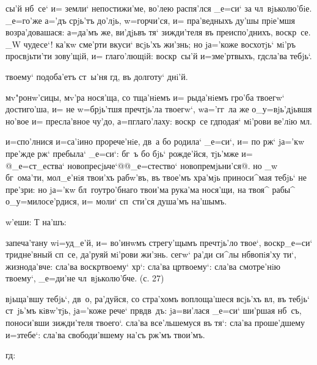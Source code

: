  сы'й нб~се` и= земли` непостижи'ме, во'лею 
распя'лся _е=си` за чл~вjьколю'бiе. _е=го'же а='дъ 
срjь'тъ до'лjь, w=горчи'ся, и= пра'ведныхъ ду'шы прiе'мшя 
возра'довашася: а=да'мъ же, ви'дjьвъ тя` зижди'теля въ 
преиспо'днихъ, воскр~се. _W чудесе`! ка'кw сме'рти вкуси` 
всjь'хъ жи'знь; но jа='коже восхотjь` мi'ръ просвjьти'ти 
зову'щiй, и= глаго'лющiй: воскр~сы'й и=з\ъ ме'ртвыхъ, 
гд сла'ва тебjь`.

  твоему` подоба'етъ ст~ы'ня гд, въ 
долготу` днi'й.

 мv"ронw'сицы, мv'ра нося'ща, со тща'нiемъ и= 
рыда'нiемъ гро'ба твоегw` достиго'ша, и= не w=брjь'тшя 
преч тjь'ла твоегw`, w\т а='гг~ла же о_у=вjь'дjьвшя 
но'вое и= пресла'вное чу'до, а=п глаго'лаху: 
воскр~се гд подая` мi'рови ве'лiю мл.



 и=спо'лнися и=са'iино прорече'нiе, дв~а бо 
родила` _е=си`, и= по рж` jа='кw пре'жде рж` 
пребыла` _е=си`: бг~ъ бо бjь` рожде'йся, тjь'мже и= 
@_е=ст_ества` новопресjьче`@{@_е=стество` 
новопремjьни'ся@}. но _w бг~ома'ти, мол_е'нiя твои'хъ 
рабw'въ, въ твое'мъ хра'мjь приноси^мая тебjь` не 
пре'зри: но jа='кw бл~гоутро'бнаго твои'ма рука'ма 
нося'щи, на твоя^ рабы^ о_у=милосе'рдися, и= моли` 
сп~сти'ся душа'мъ на'шымъ.

  w'еши: Т   
на'шъ:


 запеча'тану w\т i=уд_е'й, и= во'инwмъ 
стрегу'щымъ преч тjь'ло твое`, воскр _е=си` 
тридне'вный сп~се, да'руяй мi'рови жи'знь. сегw` ра'ди 
си^лы нб вопiя'ху ти`, жизнода'вче: сла'ва 
воскр твоему` хр`: сла'ва цр твоему`: 
сла'ва смотре'нiю твоему`, _е=ди'не чл~вjьколю'бче. (с. 
27)

  вjьща'вшу тебjь`, дв~о, 
ра'дуйся, со стра'хомъ воплоща'шеся всjь'хъ вл, въ 
тебjь` ст~jь'мъ кiвw'тjь, jа='коже рече` прв дв~дъ: 
jа=ви'лася _е=си` ши'ршая нб~съ, поноси'вши зижди'теля 
твоего`. сла'ва все'льшемуся въ тя`: сла'ва проше'дшему 
и=з\ъ тебе`: сла'ва свободи'вшему на'съ рж'мъ 
твои'мъ.

     гд: 
